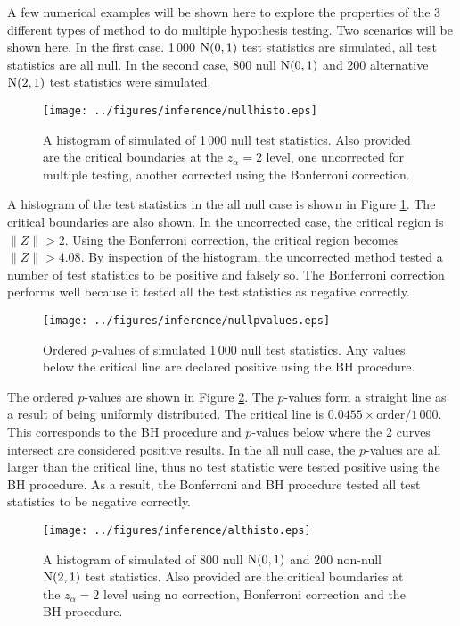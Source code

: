 A few numerical examples will be shown here to explore the properties of the 3 different types of method to do multiple hypothesis testing. Two scenarios will be shown here. In the first case. 1\,000 $\operatorname{N}(0,1)$ test statistics are simulated, all test statistics are all null. In the second case, 800 null $\operatorname{N}(0,1)$ and 200 alternative $\operatorname{N}(2,1)$ test statistics were simulated. 

\begin{figure}
	\centering
	\texttt{[image: ../figures/inference/nullhisto.eps]}
	\caption{A histogram of simulated of 1\,000 null test statistics. Also provided are the critical boundaries at the $z_\alpha=2$ level, one uncorrected for multiple testing, another corrected using the Bonferroni correction.}
	\label{fig:inference_nullhisto}
\end{figure}

A histogram of the test statistics in the all null case is shown in Figure \ref{fig:inference_nullhisto}. The critical boundaries are also shown. In the uncorrected case, the critical region is $\|Z\|>2$. Using the Bonferroni correction, the critical region becomes $\|Z\|>4.08$. By inspection of the histogram, the uncorrected method tested a number of test statistics to be positive and falsely so. The Bonferroni correction performs well because it tested all the test statistics as negative correctly.

\begin{figure}
	\centering
	\texttt{[image: ../figures/inference/nullpvalues.eps]}
	\caption{Ordered $p$-values of simulated 1\,000 null test statistics. Any values below the critical line are declared positive using the BH procedure.}
	\label{fig:inference_nullpvalues}
\end{figure} 

The ordered $p$-values are shown in Figure \ref{fig:inference_nullpvalues}. The $p$-values form a straight line as a result of being uniformly distributed. The critical line is $0.0455\times\text{order}/1\,000$. This corresponds to the BH procedure and $p$-values below where the 2 curves intersect are considered positive results. In the all null case, the $p$-values are all larger than the critical line, thus no test statistic were tested positive using the BH procedure. As a result, the Bonferroni and BH procedure tested all test statistics to be negative correctly.

\begin{figure}
	\centering
	\texttt{[image: ../figures/inference/althisto.eps]}
	\caption{A histogram of simulated of 800 null $\operatorname{N}(0,1)$ and 200 non-null $\operatorname{N}(2,1)$ test statistics. Also provided are the critical boundaries at the $z_\alpha=2$ level using no correction, Bonferroni correction and the BH procedure.}
	\label{fig:inference_althisto}
\end{figure}

